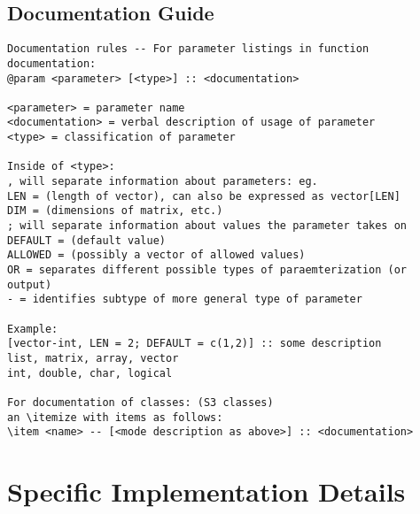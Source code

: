 \documentclass[11pt]{article}
\begin{document}
\pagebreak

\subsection{Documentation Guide}
\begin{verbatim}
Documentation rules -- For parameter listings in function documentation: 
@param <parameter> [<type>] :: <documentation>

<parameter> = parameter name
<documentation> = verbal description of usage of parameter
<type> = classification of parameter

Inside of <type>: 
, will separate information about parameters: eg. 
LEN = (length of vector), can also be expressed as vector[LEN]
DIM = (dimensions of matrix, etc.)
; will separate information about values the parameter takes on
DEFAULT = (default value)
ALLOWED = (possibly a vector of allowed values)
OR = separates different possible types of paraemterization (or output)
- = identifies subtype of more general type of parameter

Example: 
[vector-int, LEN = 2; DEFAULT = c(1,2)] :: some description
list, matrix, array, vector
int, double, char, logical

For documentation of classes: (S3 classes)
an \itemize with items as follows: 
\item <name> -- [<mode description as above>] :: <documentation>

\end{verbatim}


\section{Specific Implementation Details}
\end{document}
